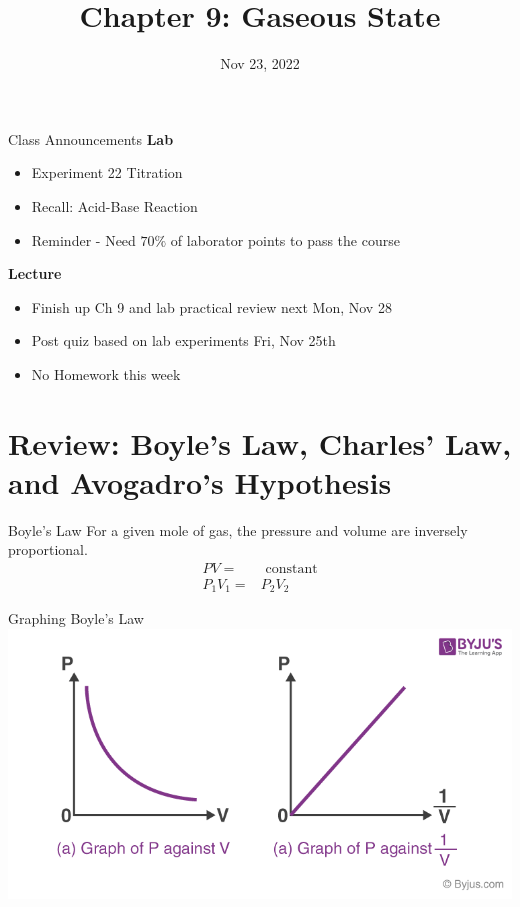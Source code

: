 \documentclass[11pt]{beamer}
\title{Chapter 9: Gaseous State}
\institute{Chemistry Department, Cypress College}
\date{Nov 23, 2022}
\begin{document}
\begin{frame}
  \titlepage
\end{frame}

\begin{frame}{Class Announcements}
  \textbf{Lab}
  \begin{itemize}
  \item Experiment 22 Titration
  \item Recall: Acid-Base Reaction
  \item Reminder - Need $70\%$ of laborator points to pass
    the course
  \end{itemize}

  \textbf{Lecture}
  \begin{itemize}
  \item Finish up Ch 9 and lab practical review next Mon, Nov 28
  \item Post quiz based on lab experiments Fri, Nov 25th
  \item No Homework this week
  \end{itemize}
\end{frame}

\section{Review: Boyle's Law, Charles' Law, and Avogadro's Hypothesis}

\begin{frame}{Boyle's Law}
  For a given mole of gas, the pressure and volume are inversely
  proportional.
  \begin{align}
    PV = & \text{ constant} \\
    P_1V_1 = & P_2V_2
  \end{align}    
\end{frame}

\begin{frame}{Graphing Boyle's Law}
  \centering
  \includegraphics[width=0.9\linewidth]{boyle_graph}
\end{frame}
\end{document}
